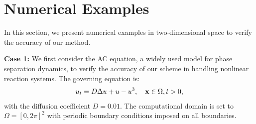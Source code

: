 \documentclass[a4paper,fleqn]{cas-sc}
\theoremstyle{definition}
\theoremstyle{remark}
\begin{document}

\section{Numerical Examples}
In this section, we present numerical examples in two-dimensional space to verify the accuracy of our method.

\textbf{Case 1:} We first consider the AC equation, a widely used model for phase separation dynamics, to verify the accuracy of our scheme in handling nonlinear reaction systems. The governing equation is:
\begin{equation} \label{eq:ac_pde}
    u_t = D\Delta u + u - u^3, \quad \mathbf{x} \in \Omega, t > 0,
\end{equation}
with the diffusion coefficient $D=0.01$. The computational domain is set to $\Omega = [0, 2\pi]^2$ with periodic boundary conditions imposed on all boundaries. 
\end{document}
